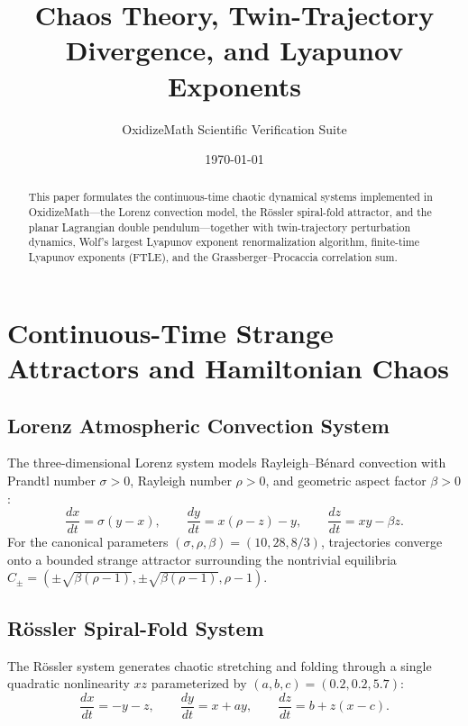 \documentclass{article}
\title{Chaos Theory, Twin-Trajectory Divergence, and Lyapunov Exponents}
\author{OxidizeMath Scientific Verification Suite}
\date{\today}
\begin{document}
\maketitle

\begin{abstract}
This paper formulates the continuous-time chaotic dynamical systems implemented in OxidizeMath---the Lorenz convection model, the R\"ossler spiral-fold attractor, and the planar Lagrangian double pendulum---together with twin-trajectory perturbation dynamics, Wolf's largest Lyapunov exponent renormalization algorithm, finite-time Lyapunov exponents (FTLE), and the Grassberger--Procaccia correlation sum.
\end{abstract}

\section{Continuous-Time Strange Attractors and Hamiltonian Chaos}

\subsection{Lorenz Atmospheric Convection System}
The three-dimensional Lorenz system models Rayleigh--B\'enard convection with Prandtl number $\sigma > 0$, Rayleigh number $\rho > 0$, and geometric aspect factor $\beta > 0$:
\begin{equation}
\frac{dx}{dt} = \sigma(y - x), \qquad
\frac{dy}{dt} = x(\rho - z) - y, \qquad
\frac{dz}{dt} = xy - \beta z.
\end{equation}
For the canonical parameters $(\sigma, \rho, \beta) = (10, 28, 8/3)$, trajectories converge onto a bounded strange attractor surrounding the nontrivial equilibria $C_{\pm} = (\pm\sqrt{\beta(\rho - 1)}, \pm\sqrt{\beta(\rho - 1)}, \rho - 1)$.

\subsection{R\"ossler Spiral-Fold System}
The R\"ossler system generates chaotic stretching and folding through a single quadratic nonlinearity $xz$ parameterized by $(a, b, c) = (0.2, 0.2, 5.7)$:
\begin{equation}
\frac{dx}{dt} = -y - z, \qquad
\frac{dy}{dt} = x + ay, \qquad
\frac{dz}{dt} = b + z(x - c).
\end{equation}
\end{document}

